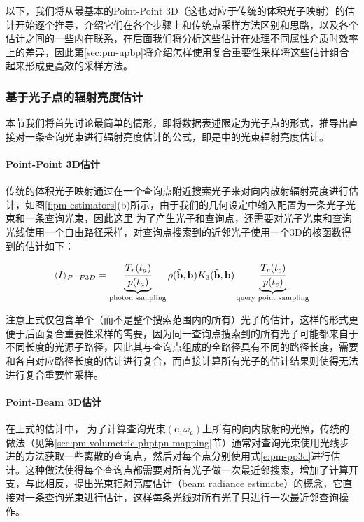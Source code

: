 以下，我们将从最基本的Point-Point 3D（这也对应于传统的体积光子映射）的估计开始逐个推导，介绍它们在各个步骤上和传统点采样方法区别和思路，以及各个估计之间的一些内在联系，在后面我们将分析这些估计在处理不同属性介质时效率上的差异，因此第\ref{sec:pm-upbp}将介绍怎样使用复合重要性采样将这些估计组合起来形成更高效的采样方法。




\subsubsection{基于光子点的辐射亮度估计}
本节我们将首先讨论最简单的情形，即将数据表述限定为光子点的形式，推导出直接对一条查询光束进行辐射亮度估计的公式，即是\cite{a:TheBeamRadianceEstimateforVolumetricPhotonMapping}中的光束辐射亮度估计。



\paragraph{Point-Point 3D估计}
传统的体积光子映射通过在一个查询点附近搜索光子来对向内散射辐射亮度进行估计，如图\ref{f:pm-estimators}(b)所示，由于我们的几何设定中输入配置为一条光子光束和一条查询光束，因此这里 为了产生光子和查询点，还需要对光子光束和查询光线使用一个自由路径采样，对查询点搜索到的近邻光子使用一个3D的核函数得到的估计如下：

\begin{equation}\label{e:pm-pp3d}
	\langle I\rangle_{P-P3D}=\underbrace{ \cfrac{T_r(t_a)}{p(t_a)}}_{\text{photon sampling}}\rho(\tilde{\mathbf{b}},\mathbf{b})K_3(\tilde{\mathbf{b}},\mathbf{b})\underbrace{ \cfrac{T_r(t_c)}{p(t_c)}}_{\text{query point sampling}}
\end{equation}

注意上式仅包含单个（而不是整个搜索范围内的所有）光子的估计，这样的形式更便于后面复合重要性采样的需要，因为同一查询点搜索到的所有光子可能都来自于不同长度的光源子路径，因此其与查询点组成的全路径具有不同的路径长度，需要和各自对应路径长度的估计进行复合，而直接计算所有光子的估计结果则使得无法进行复合重要性采样。




\paragraph{Point-Beam 3D估计}
在上式的估计中， 为了计算查询光束$(\mathbf{c},\omega_{\mathbf{c}})$上所有的向内散射的光照，传统的做法（见第\ref{sec:pm-volumetric-phptpn-mapping}节）通常对查询光束使用光线步进的方法获取一些离散的查询点，然后对每个点分别使用式\ref{e:pm-pp3d}进行估计。这种做法使得每个查询点都需要对所有光子做一次最近邻搜索，增加了计算开支，与此相反，\cite{a:TheBeamRadianceEstimateforVolumetricPhotonMapping}提出光束辐射亮度估计（beam radiance estimate）的概念，它直接对一条查询光束进行估计，这样每条光线对所有光子只进行一次最近邻查询操作。

